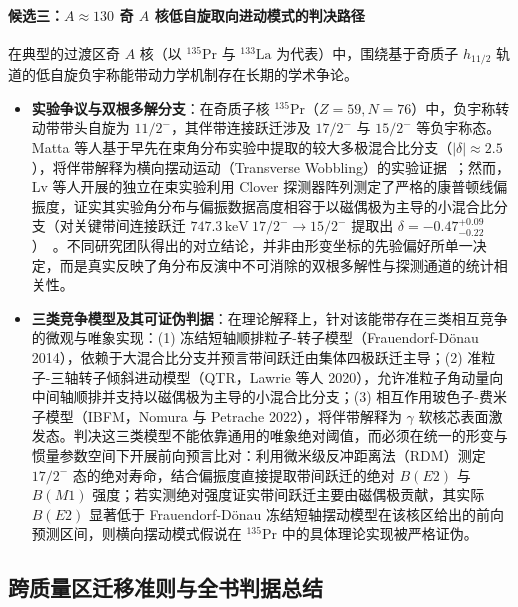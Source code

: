 \paragraph{候选三：$A \approx 130$ 奇 $A$ 核低自旋取向进动模式的判决路径}
在典型的过渡区奇 $A$ 核（以 $^{135}\mathrm{Pr}$ 与 $^{133}\mathrm{La}$ 为代表）中，围绕基于奇质子 $h_{11/2}$ 轨道的低自旋负宇称能带动力学机制存在长期的学术争论。\cite{lawrie-2020-tilted-precession-wobbling,frauendorf-2014-transverse-wobbling,nomura-2022-questioning-wobbling-ibfm,lv-2022-evidence-against-wobbling-135pr,matta-2015-transverse-wobbling-135pr}
\begin{itemize}
\item \textbf{实验争议与双根多解分支}：在奇质子核 $^{135}\mathrm{Pr}$（$Z=59, N=76$）中，负宇称转动带带头自旋为 $11/2^-$，其伴带连接跃迁涉及 $17/2^-$ 与 $15/2^-$ 等负宇称态。Matta 等人基于早先在束角分布实验中提取的较大多极混合比分支（$|\delta| \approx 2.5$），将伴带解释为横向摆动运动（Transverse Wobbling）的实验证据~\cite{matta-2015-transverse-wobbling-135pr}；然而，Lv 等人开展的独立在束实验利用 Clover 探测器阵列测定了严格的康普顿线偏振度，证实其实验角分布与偏振数据高度相容于以磁偶极为主导的小混合比分支（对关键带间连接跃迁 $747.3\,\mathrm{keV}\ 17/2^- \to 15/2^-$ 提取出 $\delta = -0.47^{+0.09}_{-0.22}$）~\cite{lv-2022-evidence-against-wobbling-135pr}。不同研究团队得出的对立结论，并非由形变坐标的先验偏好所单一决定，而是真实反映了角分布反演中不可消除的双根多解性与探测通道的统计相关性。
\item \textbf{三类竞争模型及其可证伪判据}：在理论解释上，针对该能带存在三类相互竞争的微观与唯象实现：(1) 冻结短轴顺排粒子-转子模型（Frauendorf-Dönau 2014），依赖于大混合比分支并预言带间跃迁由集体四极跃迁主导；(2) 准粒子-三轴转子倾斜进动模型（QTR，Lawrie 等人 2020），允许准粒子角动量向中间轴顺排并支持以磁偶极为主导的小混合比分支；(3) 相互作用玻色子-费米子模型（IBFM，Nomura 与 Petrache 2022），将伴带解释为 $\gamma$ 软核芯表面激发态。判决这三类模型不能依靠通用的唯象绝对阈值，而必须在统一的形变与惯量参数空间下开展前向预言比对：利用微米级反冲距离法（RDM）测定 $17/2^-$ 态的绝对寿命，结合偏振度直接提取带间跃迁的绝对 $B(E2)$ 与 $B(M1)$ 强度；若实测绝对强度证实带间跃迁主要由磁偶极贡献，其实际 $B(E2)$ 显著低于 Frauendorf-Dönau 冻结短轴摆动模型在该核区给出的前向预测区间，则横向摆动模式假说在 $^{135}\mathrm{Pr}$ 中的具体理论实现被严格证伪。
\end{itemize}

\subsection{跨质量区迁移准则与全书判据总结}\label{sec:3-8-5}

